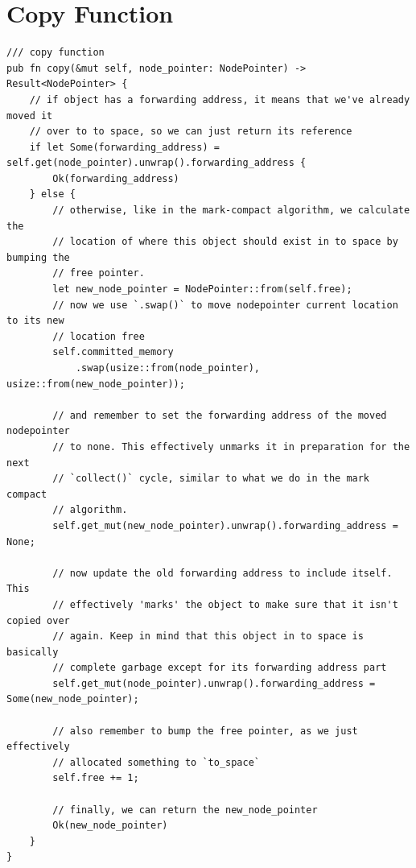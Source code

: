 \documentclass[index]{subfiles}
\begin{document}
\section{Copy Function}
\begin{verbatim}
/// copy function
pub fn copy(&mut self, node_pointer: NodePointer) -> Result<NodePointer> {
    // if object has a forwarding address, it means that we've already moved it
    // over to to space, so we can just return its reference
    if let Some(forwarding_address) = self.get(node_pointer).unwrap().forwarding_address {
        Ok(forwarding_address)
    } else {
        // otherwise, like in the mark-compact algorithm, we calculate the
        // location of where this object should exist in to space by bumping the
        // free pointer.
        let new_node_pointer = NodePointer::from(self.free);
        // now we use `.swap()` to move nodepointer current location to its new
        // location free
        self.committed_memory
            .swap(usize::from(node_pointer), usize::from(new_node_pointer));

        // and remember to set the forwarding address of the moved nodepointer
        // to none. This effectively unmarks it in preparation for the next
        // `collect()` cycle, similar to what we do in the mark compact
        // algorithm.
        self.get_mut(new_node_pointer).unwrap().forwarding_address = None;

        // now update the old forwarding address to include itself. This
        // effectively 'marks' the object to make sure that it isn't copied over
        // again. Keep in mind that this object in to space is basically
        // complete garbage except for its forwarding address part
        self.get_mut(node_pointer).unwrap().forwarding_address = Some(new_node_pointer);

        // also remember to bump the free pointer, as we just effectively
        // allocated something to `to_space`
        self.free += 1;

        // finally, we can return the new_node_pointer
        Ok(new_node_pointer)
    }
}
\end{verbatim}
\end{document}
